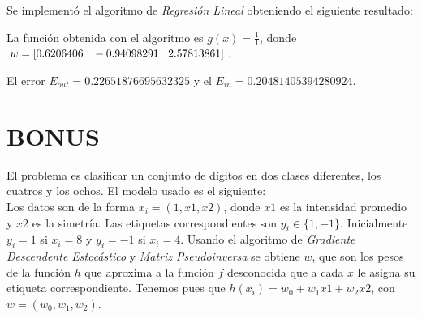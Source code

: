 \documentclass{article}
\begin{document}
Se implementó el algoritmo de \textit{Regresión Lineal} obteniendo el siguiente resultado:

\begin{figure}[H]
  \centering
\end{figure}

La función obtenida con el algoritmo es $g(x)= \frac{1}{1}$, donde $w = [0.6206406 \hspace{3mm} -0.94098291 \hspace{3mm} 2.57813861]$.

El error $E_{out} = 0.22651876695632325$ y el $E_{in} = 0.20481405394280924$.

\section{BONUS}

El problema es clasificar un conjunto de dígitos en dos clases diferentes, los cuatros y los ochos.
El modelo usado es el siguiente:\\
Los datos son de la forma $x_i = (1, x1, x2)$, donde $x1$ es la intensidad promedio y $x2$ es la simetría. Las etiquetas correspondientes son $y_i \in \{1, -1\}$. Inicialmente $y_i = 1$ si $x_i = 8$ y $y_i = -1$ si $x_i = 4$.
Usando el algoritmo de \textit{Gradiente Descendente Estocástico} y \textit{Matriz Pseudoinversa} se obtiene $w$, que son los pesos de la función $h$ que aproxima a la función $f$ desconocida que a cada $x$ le asigna su etiqueta correspondiente. Tenemos pues que $h(x_i) = w_0 + w_1x1 + w_2x2$, con $w = (w_0, w_1, w_2)$.\\
\end{document}
